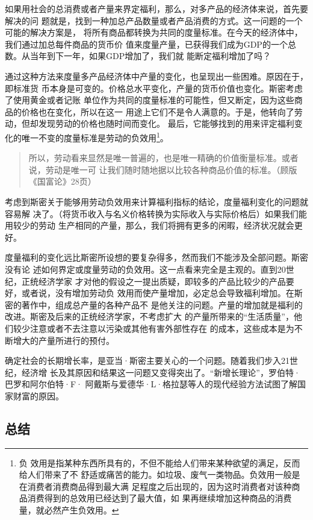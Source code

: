 如果用社会的总消费或者产量来界定福利，那么，对多产品的经济体来说，首先要解决的问
题就是，找到一种加总产品数量或者产品消费的方式。这一问题的一个可能的解决方案是，
将所有商品都转换为共同的度量标准。在今天的经济体中，我们通过加总每件商品的货币价
值来度量产量，已获得我们成为GDP的一个总数。从当年到下一年，如果GDP增加了，我们就
能断定福利增加了吗？

通过这种方法来度量多产品经济体中产量的变化，也呈现出一些困难。原因在于，即标准货
币本身是可变的。价格总水平变化，产量的货币价值也变化。斯密考虑了使用黄金或者记账
单位作为共同的度量标准的可能性，但又断定，因为这些商品的价格也在变化，所以在这一
用途上它们不是令人满意的。于是，他转向了劳动，但却发现劳动的价格也随时间而变化。
最后，它能够找到的用来评定福利变化的唯一不变的度量标准是劳动的负效用\footnote{负
  效用是指某种东西所具有的，不但不能给人们带来某种欲望的满足，反而给人们带来了不
  舒适或痛苦的能力。如垃圾、废气一类物品。负效用一般是在消费者消费商品得到最大满
  足程度之后出现的，因为这时消费者对该种商品消费得到的总效用已经达到了最大值，如
  果再继续增加这种商品的消费量，就必然产生负效用。}。

\begin{quotation}
所以，劳动看来显然是唯一普遍的，也是唯一精确的价值衡量标准。或者说，劳动是唯一可
让我们随时随地据以比较各种商品价值的标准。（顾版《国富论》28页）
\end{quotation}

 考虑到斯密关于能够用劳动负效用来计算福利指标的结论，度量福利变化的问题就容易解
 决了。（将货币收入与名义价格转换为实际收入与实际价格后）如果我们能用较少的劳动
 生产相同的产量，那么，我们将拥有更多的闲暇，经济状况就会更好。

 度量福利的变化远比斯密所设想的要复杂得多，然而我们不能涉及全部问题。斯密没有论
 述如何界定或度量劳动的负效用。这一点看来完全是主观的。直到20世纪，正统经济学家
 才对他的假设之一提出质疑，即较多的产品比较少的产品要好，或者说，没有增加劳动负
 效用而使产量增加，必定总会导致福利增加。在斯密的著作中，组成总产量的各种产品不
 是他关注的问题。产量的增加就是福利的改进。斯密及后来的正统经济学家，不考虑扩大
 的产量所带来的“生活质量”，他们较少注意或者不去注意以污染或其他有害外部性存在
 的成本，这些成本是为不断增大的产量所进行的预付。

 确定社会的长期增长率，是亚当·斯密主要关心的一个问题。随着我们步入21世纪，经济增
 长及其原因和结果这一问题又变得突出了。“新增长理论”，罗伯特·巴罗和阿尔伯特·F·
 阿戴斯与爱德华·L·格拉瑟等人的现代经验方法试图了解国家财富的原因。

 \subsection{总结}

